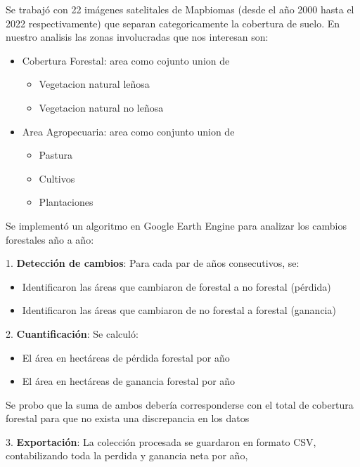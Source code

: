 \documentclass[11pt]{article}
\begin{document}
Se trabajó con 22 imágenes satelitales de Mapbiomas (desde el año 2000 hasta el 2022 respectivamente) que separan categoricamente la cobertura de suelo.
En nuestro analisis las zonas involucradas que nos interesan son:

\begin{itemize}
    \item Cobertura Forestal: area como cojunto union de
            \begin{itemize}
                \item Vegetacion natural leñosa
                \item Vegetacion natural no leñosa
            \end{itemize}
    \item Area Agropecuaria: area como conjunto union de
    \begin{itemize}
        \item Pastura
        \item Cultivos
        \item Plantaciones
    \end{itemize}
\end{itemize}

Se implementó un algoritmo en Google Earth Engine para analizar los cambios forestales año a año:

1. \textbf{Detección de cambios}: Para cada par de años consecutivos, se:

   \begin{itemize}
       \item Identificaron las áreas que cambiaron de forestal a no forestal (pérdida)
       \item Identificaron las áreas que cambiaron de no forestal a forestal (ganancia)
   \end{itemize}

2. \textbf{Cuantificación}: Se calculó:

   \begin{itemize}
       \item  El área en hectáreas de pérdida forestal por año
       \item  El área en hectáreas de ganancia forestal por año

   \end{itemize}

Se probo que la suma de ambos debería corresponderse con el total de cobertura forestal para que no exista una discrepancia en los datos

3. \textbf{Exportación}: La colección procesada se guardaron en formato CSV, contabilizando toda la perdida y ganancia neta por año, 
\end{document}
